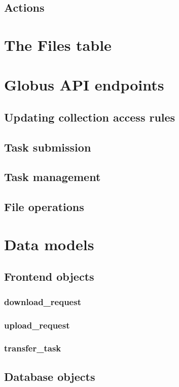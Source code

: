 \documentclass{report}
\begin{document}
\section{Actions}

\appendix

\chapter{The Files table}

\chapter{Globus API endpoints}
\section{Updating collection access rules}
\section{Task submission}
\section{Task management}
\section{File operations}

\chapter{Data models}
\section{Frontend objects}
\subsection{download\_request}
\subsection{upload\_request}
\subsection{transfer\_task}
\section{Database objects}
\end{document}
